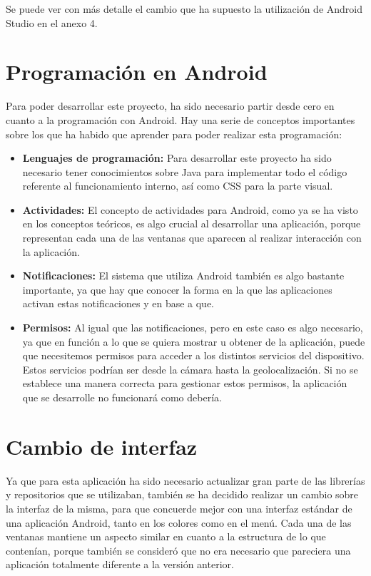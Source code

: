 Se puede ver con más detalle el cambio que ha supuesto la utilización de Android Studio en el anexo 4.

\section{Programación en Android}

Para poder desarrollar este proyecto, ha sido necesario partir desde cero en cuanto a la programación con Android. Hay una serie de conceptos importantes sobre los que ha habido que aprender para poder realizar esta programación:

\begin{itemize}
\item \textbf{Lenguajes de programación:} Para desarrollar este proyecto ha sido necesario tener conocimientos sobre Java para implementar todo el código referente al funcionamiento interno, así como CSS para la parte visual.
\item \textbf{Actividades:} El concepto de actividades para Android, como ya se ha visto en los conceptos teóricos, es algo crucial al desarrollar una aplicación, porque representan cada una de las ventanas que aparecen al realizar interacción con la aplicación.
\item \textbf{Notificaciones:} El sistema que utiliza Android también es algo bastante importante, ya que hay que conocer la forma en la que las aplicaciones activan estas notificaciones y en base a que.
\item \textbf{Permisos:} Al igual que las notificaciones, pero en este caso es algo necesario, ya que en función a lo que se quiera mostrar u obtener de la aplicación, puede que necesitemos permisos para acceder a los distintos servicios del dispositivo. Estos servicios podrían ser desde la cámara hasta la geolocalización. Si no se establece una manera correcta para gestionar estos permisos, la aplicación que se desarrolle no funcionará como debería.
\end{itemize}

\section{Cambio de interfaz}

Ya que para esta aplicación ha sido necesario actualizar gran parte de las librerías y repositorios que se utilizaban, también se ha decidido realizar un cambio sobre la interfaz de la misma, para que concuerde mejor con una interfaz estándar de una aplicación Android, tanto en los colores como en el menú. Cada una de las ventanas mantiene un aspecto similar en cuanto a la estructura de lo que contenían, porque también se consideró que no era necesario que pareciera una aplicación totalmente diferente a la versión anterior. 


